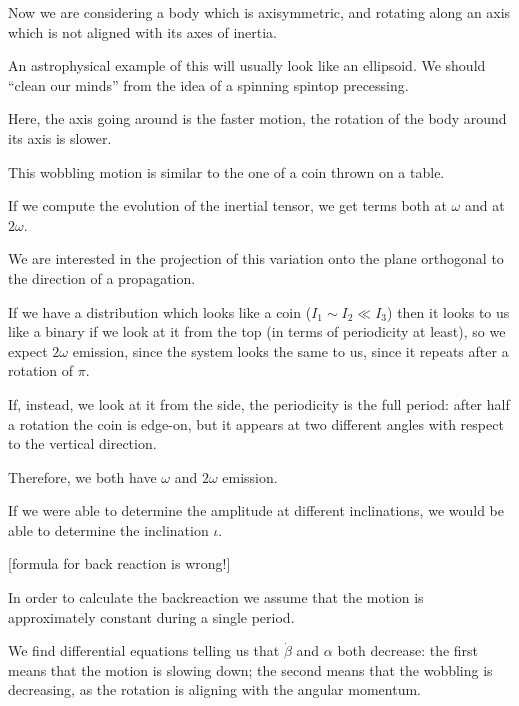 \documentclass[main.tex]{subfiles}
\begin{document}

Now we are considering a body which is axisymmetric, and rotating along an axis which is not aligned with its axes of inertia. 

An astrophysical example of this will usually look like an ellipsoid.
We should ``clean our minds'' from the idea of a spinning spintop precessing.

Here, the axis going around is the faster motion, the rotation of the body around its axis is slower. 

This wobbling motion is similar to the one of a coin thrown on a table.

If we compute the evolution of the inertial tensor, we get terms both at \(\omega \) and at \(2 \omega \). 

We are interested in the projection of this variation onto the plane orthogonal to the direction of a propagation. 

If we have a distribution which looks like a coin (\(I_1 \sim I_2 \ll I_3 \)) then it looks to us like a binary if we look at it from the top (in terms of periodicity at least), so we expect \(2 \omega \) emission, since the system looks the same to us, since it repeats after a rotation of \(\pi \). 

If, instead, we look at it from the side, the periodicity is the full period: after half a rotation the coin is edge-on, but it appears at two different angles with respect to the vertical direction.

Therefore, we both have \(\omega \) and \(2 \omega \) emission. 

If we were able to determine the amplitude at different inclinations, we would be able to determine the inclination \(\iota \). 

[formula for back reaction is wrong!]

In order to calculate the backreaction we assume that the motion is approximately constant during a single period. 

We find differential equations telling us that \(\dot{\beta}
\) and \(\alpha \) both decrease: the first means that the motion is slowing down; the second means that the wobbling is decreasing, as the rotation is aligning with the angular momentum.
\end{document}
